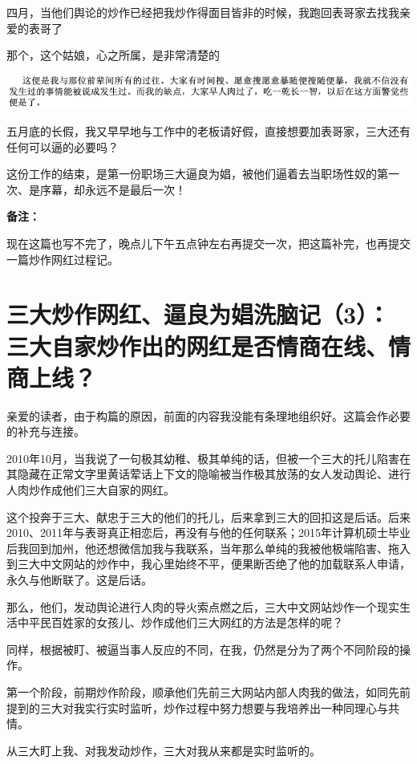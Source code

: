 \documentclass[9pt, b5paper]{article}
\begin{document}
四月，当他们舆论的炒作已经把我炒作得面目皆非的时候，我跑回表哥家去找我亲爱的表哥了

那个，这个姑娘，心之所属，是非常清楚的

\begin{center}
\includegraphics[width=.9\linewidth]{./pic/backups_plans_20210412_104959.png}
\end{center}

五月底的长假，我又早早地与工作中的老板请好假，直接想要加表哥家，三大还有任何可以逼的必要吗？

这份工作的结束，是第一份职场三大逼良为娼，被他们逼着去当职场性奴的第一次、是序幕，却永远不是最后一次！

\textbf{备注：}

现在这篇也写不完了，晚点儿下午五点钟左右再提交一次，把这篇补完，也再提交一篇炒作网红过程记。

\section{三大炒作网红、逼良为娼洗脑记（3）：三大自家炒作出的网红是否情商在线、情商上线？}
\label{sec:org0d068ae}

亲爱的读者，由于构篇的原因，前面的内容我没能有条理地组织好。这篇会作必要的补充与连接。

2010年10月，当我说了一句极其幼稚、极其单纯的话，但被一个三大的托儿陷害在其隐藏在正常文字里黄话荤话上下文的隐喻被当作极其放荡的女人发动舆论、进行人肉炒作成他们三大自家的网红。

这个投奔于三大、献忠于三大的他们的托儿，后来拿到三大的回扣这是后话。后来2010、2011年与表哥真正相恋后，再没有与他的任何联系；2015年计算机硕士毕业后我回到加州，他还想微信加我与我联系，当年那么单纯的我被他极端陷害、拖入到三大中文网站的炒作中，我心里始终不平，便果断否绝了他的加载联系人申请，永久与他断联了。这是后话。 

那么，他们，发动舆论进行人肉的导火索点燃之后，三大中文网站炒作一个现实生活中平民百姓家的女孩儿、炒作成他们三大网红的方法是怎样的呢？

同样，根据被盯、被逼当事人反应的不同，在我，仍然是分为了两个不同阶段的操作。

第一个阶段，前期炒作阶段，顺承他们先前三大网站内部人肉我的做法，如同先前提到的三大对我实行实时监听，炒作过程中努力想要与我培养出一种同理心与共情。

从三大盯上我、对我发动炒作，三大对我从来都是实时监听的。
\end{document}
